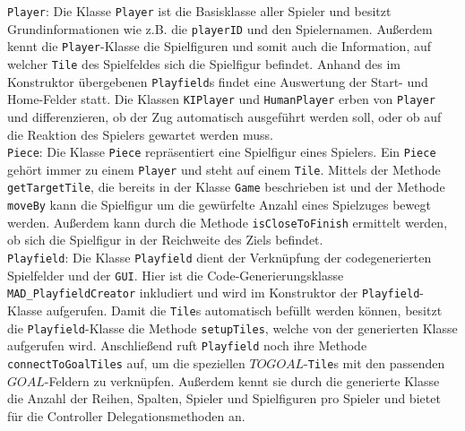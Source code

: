 \documentclass[conference]{IEEEtran}
\begin{document}
\texttt{Player}: Die Klasse \texttt{Player} ist die Basisklasse aller Spieler und besitzt Grundinformationen wie z.B. die \texttt{playerID} und den Spielernamen. Au{\ss}erdem kennt die \texttt{Player}-Klasse die Spielfiguren und somit auch die Information, auf welcher \texttt{Tile} des Spielfeldes sich die Spielfigur befindet. Anhand des im Konstruktor \"ubergebenen \texttt{Playfield}s findet eine Auswertung der Start- und Home-Felder statt. Die Klassen \texttt{KIPlayer} und \texttt{HumanPlayer} erben von \texttt{Player} und differenzieren, ob der Zug automatisch ausgef\"uhrt werden soll, oder ob auf die Reaktion des Spielers gewartet werden muss. \\

\texttt{Piece}: Die Klasse \texttt{Piece} repr\"asentiert eine Spielfigur eines Spielers. Ein \texttt{Piece} geh\"ort immer zu einem \texttt{Player} und steht auf einem \texttt{Tile}. Mittels der Methode \texttt{getTargetTile}, die bereits in der Klasse \texttt{Game} beschrieben ist und der Methode \texttt{moveBy} kann die Spielfigur um die gew\"urfelte Anzahl eines Spielzuges bewegt werden. Au{\ss}erdem kann durch die Methode \texttt{isCloseToFinish} ermittelt werden, ob sich die Spielfigur in der Reichweite des Ziels befindet. \\

\label{sec:model_playfield}
\texttt{Playfield}: Die Klasse \texttt{Playfield} dient der Verkn\"upfung der codegenerierten Spielfelder und der \texttt{GUI}. Hier ist die Code-Generierungsklasse \texttt{MAD\_PlayfieldCreator} inkludiert und wird im Konstruktor der \texttt{Playfield}-Klasse aufgerufen. Damit die \texttt{Tile}s automatisch bef\"ullt werden k\"onnen, besitzt die \texttt{Playfield}-Klasse die Methode \texttt{setupTiles}, welche von der generierten Klasse aufgerufen wird. Anschlie\ss end ruft \texttt{Playfield} noch ihre Methode \texttt{connectToGoalTiles} auf, um die speziellen $TOGOAL$-\texttt{Tile}s mit den passenden
$GOAL$-Feldern zu verkn\"upfen. Au{\ss}erdem kennt sie durch die generierte Klasse die Anzahl der Reihen, Spalten, Spieler und Spielfiguren pro Spieler und bietet f\"ur die Controller Delegationsmethoden an.\\
\end{document}
